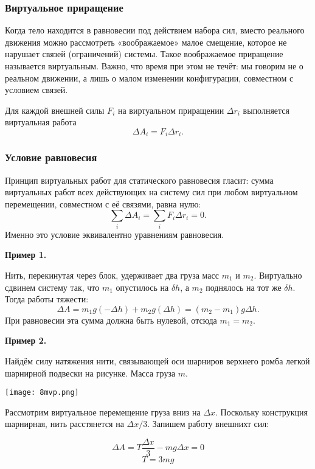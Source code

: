 \documentclass[12pt, a4paper]{article}%
\begin{document}
\subsubsection*{Виртуальное приращение}
Когда тело находится в равновесии под действием набора сил, вместо реального движения можно рассмотреть «воображаемое» малое смещение, 
которое не нарушает связей (ограничений) системы. Такое воображаемое приращение называется виртуальным. Важно, что время при этом не течёт: мы говорим не о реальном движении, а лишь о малом изменении конфигурации, совместном с условием связей.

Для каждой внешней силы $F_i$ на виртуальном приращении $\Delta r_i$ выполняется виртуальная работа 
\[
\Delta A_i =  F_i\Delta r_i.
\]

\subsubsection*{Условие равновесия}
Принцип виртуальных работ для статического равновесия гласит: сумма виртуальных работ всех действующих на систему сил при любом виртуальном перемещении, совместном с её связями, равна нулю:
\[
\sum_i \Delta A_i = \sum_i F_i\Delta r_i = 0.
\]
Именно это условие эквивалентно уравнениям равновесия.

\textbf{Пример 1.}

Нить, перекинутая через блок, удерживает два груза масс $m_1$ и $m_2$. Виртуально сдвинем систему так, что $m_1$ опустилось на $\delta h$, а $m_2$ поднялось на тот же $\delta h$. Тогда работы тяжести: 
\[
\Delta A = m_1 g(-\Delta h) + m_2 g(\Delta h) = (m_2 - m_1)g\Delta h.
\]
При равновесии эта сумма должна быть нулевой, отсюда $m_1=m_2$.

\textbf{Пример 2.}

Найдём силу натяжения нити, связывающей оси шарниров верхнего ромба легкой шарнирной подвески на рисунке. Масса груза $m$.

\begin{center}
\texttt{[image: 8mvp.png]}
\label{fig:mpr}
\end{center}

Рассмотрим виртуальное перемещение груза вниз на $\Delta x$. Поскольку конструкция шарнирная, нить расстянется на $\Delta x/3$. Запишем работу внешнихт сил:


\[
\Delta A = T\frac{\Delta x}{3} -mg\Delta x = 0
\]
\[T = 3mg
\]
\end{document}
